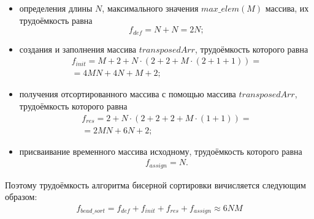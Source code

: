 \begin{itemize}[label=---]
	\item определения длины $N$, максимального значения $max\_elem (M)$ массива, их трудоёмкость равна
	\begin{equation}
		\label{complexity:def1}
		f_{def} = N + N = 2N;
	\end{equation}
	
	\item создания и заполнения массива $transposedArr$, трудоёмкость которого равна
	\begin{equation}
		\label{сomplexity:v_init}
		\begin{gathered}
			f_{init} = M + 2 + N \cdot (2 + 2 + M \cdot (2 + 1 + 1)) = \\
			= 4MN + 4N + M + 2;
		\end{gathered}
	\end{equation}
	
	\item получения отсортированного массива с помощью массива $transposedArr$, трудоёмкость которого равна
	\begin{equation}
		\label{complexity:res1}
		\begin{gathered}
			f_{res} = 2 + N \cdot (2 + 2 + 2 + M \cdot (1 + 1)) = \\
			= 2MN + 6N + 2;
		\end{gathered}
	\end{equation}
	
	\item присваивание временного массива исходному, трудоёмкость которого равна
	\begin{equation}
	\label{complexity:assign}
	\begin{gathered}
		f_{assign} = N.
	\end{gathered}
	\end{equation}
	
\end{itemize}
Поэтому трудоёмкость алгоритма бисерной сортировки вичисляется следующим образом:
\begin{equation}
	\label{сomplexity:bead_worst}
	\begin{gathered}
		f_{bead\_sort} = f_{def} + f_{init} + f_{res} + f_{assign} \approx 6NM
	\end{gathered}
\end{equation}

